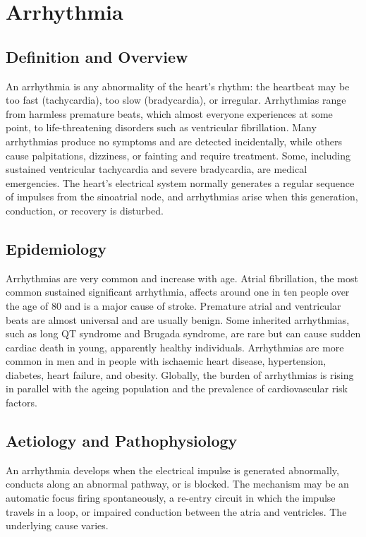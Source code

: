 \chapter{Arrhythmia}

\section*{Definition and Overview}
An arrhythmia is any abnormality of the heart's rhythm: the heartbeat may be too fast (tachycardia), too slow (bradycardia), or irregular. Arrhythmias range from harmless premature beats, which almost everyone experiences at some point, to life-threatening disorders such as ventricular fibrillation. Many arrhythmias produce no symptoms and are detected incidentally, while others cause palpitations, dizziness, or fainting and require treatment. Some, including sustained ventricular tachycardia and severe bradycardia, are medical emergencies. The heart's electrical system normally generates a regular sequence of impulses from the sinoatrial node, and arrhythmias arise when this generation, conduction, or recovery is disturbed.

\section*{Epidemiology}
Arrhythmias are very common and increase with age. Atrial fibrillation, the most common sustained significant arrhythmia, affects around one in ten people over the age of 80 and is a major cause of stroke. Premature atrial and ventricular beats are almost universal and are usually benign. Some inherited arrhythmias, such as long QT syndrome and Brugada syndrome, are rare but can cause sudden cardiac death in young, apparently healthy individuals. Arrhythmias are more common in men and in people with ischaemic heart disease, hypertension, diabetes, heart failure, and obesity. Globally, the burden of arrhythmias is rising in parallel with the ageing population and the prevalence of cardiovascular risk factors.

\section*{Aetiology and Pathophysiology}
An arrhythmia develops when the electrical impulse is generated abnormally, conducts along an abnormal pathway, or is blocked. The mechanism may be an automatic focus firing spontaneously, a re-entry circuit in which the impulse travels in a loop, or impaired conduction between the atria and ventricles. The underlying cause varies.


